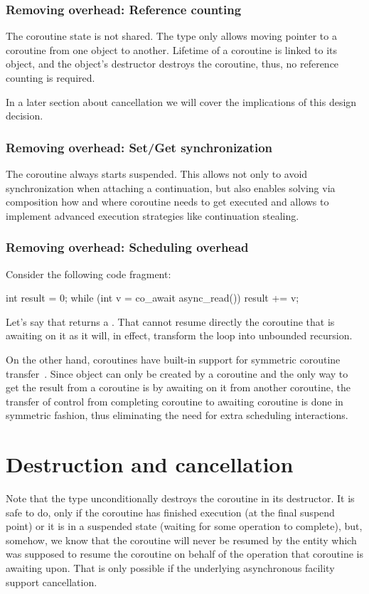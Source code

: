 \subsubsection{Removing  overhead: Reference counting}

The coroutine state is not shared. The  type only allows moving pointer to a coroutine from one  object to another. Lifetime of a coroutine is linked to its  object, and the  object's destructor destroys the coroutine, thus, no reference counting is required.

In a later section about cancellation we will cover the implications of this design decision.

\subsubsection{Removing  overhead: Set/Get synchronization}

The  coroutine always starts suspended. This allows not only to avoid synchronization when attaching a continuation, but also enables solving via composition how and where coroutine needs to get executed and allows to implement advanced execution strategies like continuation stealing.

\subsubsection{Removing  overhead: Scheduling overhead}
Consider the following code fragment:
\begin{codeblock}
int result = 0;
while (int v = co_await async_read())
  result += v;
\end{codeblock}
Let's say that  returns a . That  cannot resume directly the coroutine that is awaiting on it as it will, in effect, transform the loop into unbounded recursion.

On the other hand, coroutines have built-in support for symmetric coroutine transfer~\cite{P0913R1}. Since  object can only be created by a coroutine and the only way to get the result from a coroutine is by awaiting on it from another coroutine, the transfer of control from completing coroutine to awaiting coroutine is done in symmetric fashion, thus eliminating the need for extra scheduling interactions.

\section{Destruction and cancellation}
Note that the  type unconditionally destroys the coroutine in its destructor. It is safe to do, only if the coroutine has finished execution (at the final suspend point) or it is in a suspended state (waiting for some operation to complete), but, somehow, we know that the coroutine will never be resumed by the entity which was supposed to resume the coroutine on behalf of the operation that coroutine is awaiting upon. That is only possible if the underlying asynchronous facility support cancellation.

